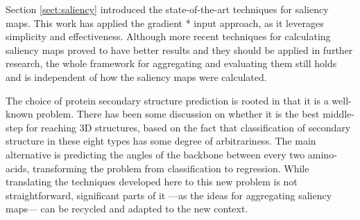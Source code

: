 Section \ref{sect:saliency} introduced the state-of-the-art techniques for saliency maps. This work has applied the gradient * input approach, as it leverages simplicity and effectiveness. Although more recent techniques for calculating saliency maps proved to have better results and they should be applied in further research, the whole framework for aggregating and evaluating them still holds and is independent of how the saliency maps were calculated.

The choice of protein secondary structure prediction is rooted in that it is a well-known problem. There has been some discussion on whether it is the best middle-step for reaching 3D structures, based on the fact that classification of secondary structure in these eight types has some degree of arbitrariness. The main alternative is predicting the angles of the backbone between every two amino-acids, transforming the problem from classification to regression. While translating the techniques developed here to this new problem is not straightforward, significant parts of it ---as the ideas for aggregating saliency maps--- can be recycled and adapted to the new context.

